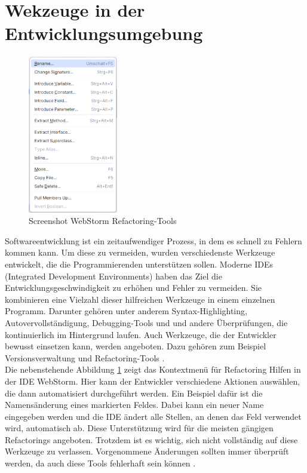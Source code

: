 \section{Wekzeuge in der Entwicklungsumgebung}
\begin{figure}
  \centering
  \includegraphics[width=0.35\textwidth]{Bilder/screenshotWebstorm} %
  \caption{Screenshot WebStorm Refactoring-Tools \cite{webstorm.2024}}
  \label{webstormRefactor}
\end{figure}
Softwareentwicklung ist ein zeitaufwendiger Prozess, in dem es schnell zu Fehlern kommen kann. Um diese zu vermeiden, wurden verschiedenste Werkzeuge entwickelt, die die Programmierenden unterstützen sollen.
Moderne IDEs (Integrated Development Environments) haben das Ziel die Entwicklungsgeschwindigkeit zu erhöhen und Fehler zu vermeiden.
Sie kombinieren eine Vielzahl dieser hilfreichen Werkzeuge in einem einzelnen Programm. Darunter gehören unter anderem Syntax-Highlighting, Autovervollständigung, Debugging-Tools und und andere Überprüfungen, die kontinuierlich im Hintergrund laufen.
Auch Werkzeuge, die der Entwickler bewusst einsetzen kann, werden angeboten. Dazu gehören zum Beispiel Versionsverwaltung und Refactoring-Tools \citep[S. 275]{modernIDEs.2022}.\\
Die nebenstehende Abbildung \ref{webstormRefactor} zeigt das Kontextmenü für Refactoring Hilfen in der IDE WebStorm. Hier kann der Entwickler verschiedene Aktionen auswählen, die dann automatisiert durchgeführt werden.
\newpage
Ein Beispiel dafür ist die Namensänderung eines markierten Feldes. Dabei kann ein neuer Name eingegeben werden und die IDE ändert alle Stellen, an denen das Feld verwendet wird, automatisch ab.
Diese Unterstützung wird für die meisten gängigen Refactorings angeboten.\cite{webstorm.2024}
Trotzdem ist es wichtig, sich nicht vollständig auf diese Werkzeuge zu verlassen. Vorgenommene Änderungen sollten immer überprüft werden, da auch diese Tools fehlerhaft sein können \citep[S. 323 f.]{fiveLines.2023}. 

